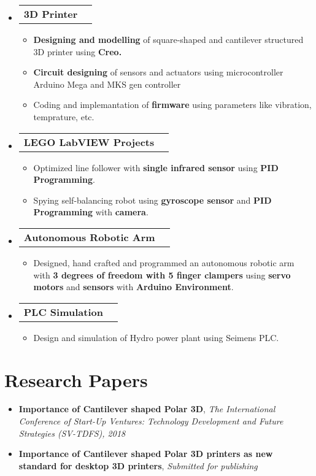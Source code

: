 \documentclass[letterpaper,11pt]{article}
\makeatletter
\newcommand{\projectSubheading}[2]{
  \vspace{-1pt}\item
    \begin{tabular*}{0.97\textwidth}{l@{\extracolsep{\fill}}r}
      \textbf{#1} & #2 \\
    \end{tabular*}\vspace{-5pt}
}
\newcommand{\resumeSubHeadingListStart}{\begin{itemize}[leftmargin=*]}
\newcommand{\resumeSubHeadingListEnd}{\end{itemize}}
\newcommand{\resumeItemListStart}{\begin{itemize}}
\newcommand{\resumeItemListEnd}{\end{itemize}\vspace{-5pt}}
\makeatother
\begin{document}
	\resumeSubHeadingListStart

		\projectSubheading
 		{3D Printer}{}
			\resumeItemListStart
				\item
				{\textbf{Designing and modelling} of square-shaped and cantilever structured 3D printer using \textbf{Creo.}}
				\item
				{\textbf{Circuit designing} of sensors and actuators using microcontroller Arduino Mega and MKS gen controller}
				\item
				{Coding and implemantation of \textbf{firmware} using parameters like vibration, temprature, etc.}
		      \resumeItemListEnd
 	
		\projectSubheading
 		{LEGO LabVIEW Projects}{}
			\resumeItemListStart
				\item
				{Optimized line follower with \textbf{single infrared sensor} using \textbf{PID Programming}.}
				\item 
				{Spying self-balancing robot using \textbf{gyroscope sensor} and \textbf{PID Programming} with \textbf{camera}.}
		      \resumeItemListEnd

		\projectSubheading
 		{Autonomous Robotic Arm}{}
			\resumeItemListStart
				\item 
				{Designed, hand crafted and programmed an autonomous robotic arm with \textbf{3 degrees of freedom with 5 finger clampers} using \textbf{servo motors} and \textbf{sensors} with \textbf{Arduino Environment}.}
		      \resumeItemListEnd
		      
	   \projectSubheading
	   {PLC Simulation}{}
	      \resumeItemListStart
	          \item 
	          {Design and simulation of Hydro power plant using Seimens PLC.}   
          \resumeItemListEnd
          
           
	\resumeSubHeadingListEnd



\section{Research Papers}
  \resumeSubHeadingListStart
    \item{\textbf{Importance of Cantilever shaped Polar 3D}, \textit{The International Conference of Start-Up Ventures: Technology Development and Future Strategies (SV-TDFS), 2018}}
    \item{\textbf{Importance of Cantilever shaped Polar 3D printers as new standard for desktop 3D printers}, \textit{Submitted for publishing}}
  \resumeSubHeadingListEnd
\end{document}
